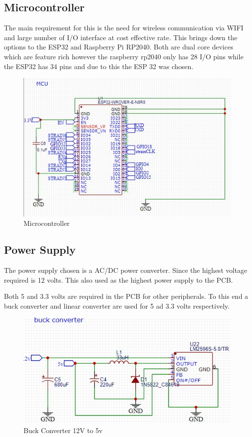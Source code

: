 \subsection{Microcontroller}
The main requirement for this is the need for wireless communication via WIFI and large number of I/O interface at cost effective rate. This brings down the options to the ESP32 and Raspberry Pi RP2040. Both are dual core devices which are feature rich however the raspberry rp2040 only has 28 I/O pins while the ESP32 has 34 pins and due to this the ESP 32 was chosen. 
\begin{center}
	\begin{figure}[H]
	\centering
	\includegraphics{Figures/mcu}
	\caption[Microcontroller]{Microcontroller}
	\end{figure}
\end{center}

\subsection{Power Supply}
The power supply chosen is a AC/DC power converter. Since the highest voltage required is 12 volts. This also used as the highest power supply to the PCB.

Both 5 and 3.3 volts are required in the PCB for other peripherals. To this end a buck converter and linear converter are used for 5 ad 3.3 volts respectively.

\begin{center}
	\begin{figure}[H]
	\centering
	\includegraphics{Figures/buck}
	\caption[Buck converter]{Buck Converter 12V to 5v}
	\end{figure}
\end{center}

